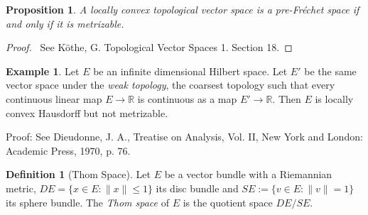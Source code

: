 \documentclass{book}
\let\qed\relax
\newtheorem{prop}[ax]{Proposition}
\theoremstyle{definition}
\newtheorem{df}[ax]{Definition}
\newtheorem{ex}[ax]{Example}
\begin{document}
\begin{prop}
A locally convex topological vector space is a pre-Fr\'{e}chet space if and only if it is metrizable.
\end{prop}

\begin{proof}
\pf\ See K\"{o}the, G. Topological Vector Spaces 1. Section 18. \qed
\end{proof}

\begin{ex}
Let $E$ be an infinite dimensional Hilbert space. Let $E'$ be the same vector space under the \emph{weak topology}, the coarsest topology such that every continuous linear map $E \rightarrow \mathbb{R}$ is continuous as a map $E' \rightarrow \mathbb{R}$. Then $E$ is locally convex Hausdorff but not metrizable.

Proof: See Dieudonne, J. A., Treatise on Analysis, Vol. II, New York and London: Academic Press, 1970, p. 76.
\end{ex}

\begin{df}[Thom Space]
Let $E$ be a vector bundle with a Riemannian metric, $DE = \{ x \in E : \| x \| \leq 1 \}$ its disc bundle and $SE := \{ v \in E : \| v \| = 1 \}$ its sphere bundle. The \emph{Thom space} of $E$ is the quotient space $DE / SE$.
\end{df}
\end{document}
